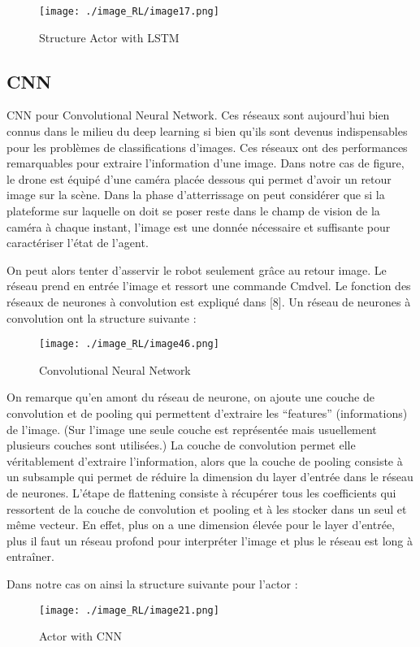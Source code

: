 \begin{figure}[H]
    \centering
    \texttt{[image: ./image\_RL/image17.png]}
    \caption{Structure Actor with LSTM}
\end{figure}

\subsection{CNN}

CNN pour Convolutional Neural Network. Ces réseaux sont aujourd’hui bien connus dans le milieu du deep learning si bien qu'ils sont devenus indispensables pour les problèmes de classifications d’images.
Ces réseaux ont des performances remarquables pour extraire l’information d’une image.
Dans notre cas de figure, le drone est équipé d’une caméra placée dessous qui permet d’avoir un retour image sur la scène.
Dans la phase d'atterrissage on peut considérer que si la plateforme sur laquelle on doit se poser reste dans le champ de vision de la caméra à chaque instant, l’image est une donnée nécessaire et suffisante pour caractériser l’état de l’agent.

On peut alors tenter d’asservir le robot seulement grâce au retour image.
Le réseau prend en entrée l’image et ressort une commande Cmdvel.
Le fonction des réseaux de neurones à convolution est expliqué dans [8].
Un réseau de neurones à convolution ont la structure suivante :
\begin{figure}[H]
    \centering
    \texttt{[image: ./image\_RL/image46.png]}
    \caption{Convolutional Neural Network  }
\end{figure}

On remarque qu’en amont du réseau de neurone, on ajoute une couche de convolution et de pooling qui permettent d’extraire les “features” (informations) de l’image. 
(Sur l’image une seule couche est représentée mais usuellement plusieurs couches sont utilisées.)
La couche de convolution permet elle véritablement d’extraire l’information, alors que la couche de pooling consiste à un subsample qui permet de réduire la dimension du layer d’entrée dans le réseau de neurones.
L’étape de flattening consiste à récupérer tous les coefficients qui ressortent de la couche de convolution et pooling et à les stocker dans un seul et même vecteur.
En effet, plus on a une dimension élevée pour le layer d'entrée, plus il faut un réseau profond pour interpréter l’image et plus le réseau est long à entraîner.

Dans notre cas on ainsi la structure suivante pour l’actor :

\begin{figure}[H]
    \centering
    \texttt{[image: ./image\_RL/image21.png]}
    \caption{ Actor with CNN }
\end{figure}